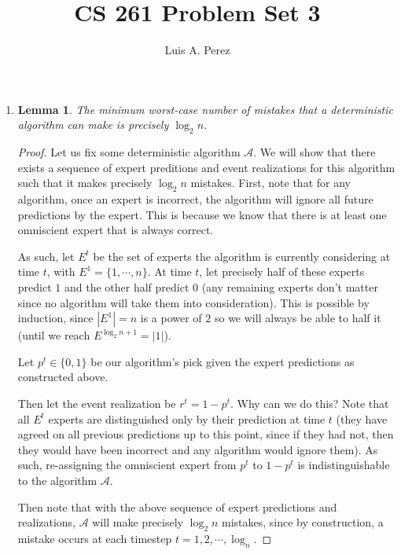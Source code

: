 \documentclass[12pt]{exam}
\newtheorem{lemma}[theorem]{Lemma}
\newcommand*{\authorname}{Luis A. Perez}
\newcommand{\Q}[1]{\question{\large{\textbf{#1}}}}
\begin{document}
\title{CS 261 Problem Set 3}
\author{\authorname}
\date{}
\maketitle
\thispagestyle{headandfoot}
\setcounter{MaxMatrixCols}{15}

\begin{questions}
\Q{Problem 13}
\begin{solution}
  \begin{enumerate}[label=(\alph*)]
    \item 
      \begin{lemma}
        The minimum worst-case number of mistakes that a deterministic algorithm can make is precisely $\log_2 n$.
      \end{lemma}
      \begin{proof}
        Let us fix some deterministic algorithm $\mathcal{A}$. We will show that there exists a sequence of expert preditions and event realizations for this algorithm such that it makes precisely $\log_2 n$ mistakes. First, note that for any algorithm, once an expert is incorrect, the algorithm will ignore all future predictions by the expert. This is because we know that there is at least one omniscient expert that is always correct.

        As such, let $E^t$ be the set of experts the algorithm is currently considering at time $t$, with $E^1 = \{1, \cdots, n\}$. At time $t$, let precisely half of these experts predict $1$ and the other half predict $0$ (any remaining experts don't matter since no algorithm will take them into consideration). This is possible by induction, since $|E^1| = n$ is a power of $2$ so we will always be able to half it (until we reach $E^{\log_2 n + 1} = |1|$).

        Let $p^t \in \{0,1\}$ be our algorithm's pick given the expert predictions as constructed above. 

        Then let the event realization be $r^t = 1 - p^t$. Why can we do this? Note that all $E^t$ experts are distinguished only by their prediction at time $t$ (they have agreed on all previous predictions up to this point, since if they had not, then they would have been incorrect and any algorithm would ignore them). As such, re-assigning the omniscient expert from $p^t$ to $1 - p^t$ is indistinguishable to the algorithm $\mathcal{A}$.

        Then note that with the above sequence of expert predictions and realizations, $\mathcal{A}$ will make precisely $\log_2 n$ mistakes, since by construction, a mistake occurs at each timestep  $t = 1, 2, \cdots, \log_n$.
      \end{proof}


\end{enumerate}
\end{solution}
\end{questions}
\end{document}
